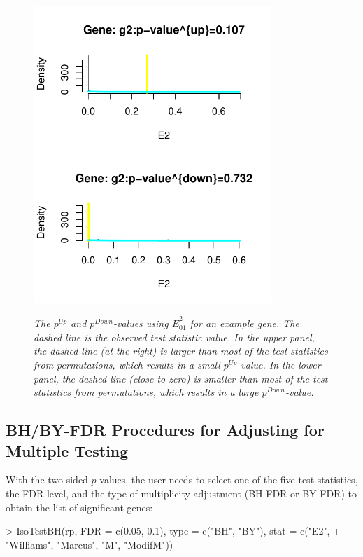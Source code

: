 \documentclass[10pt]{article}
\begin{document}
  
\begin{figure}[!h]
\centering
{\includegraphics[width=0.8\textwidth]{IsoGene-IsopvaluePlot.pdf}}
\caption{\em{The $p^{Up}$ and $p^{Down}$-values using
$\bar{E}_{01}^2$ for an example gene. The dashed line is the
observed test statistic value. In the upper panel, the dashed line
(at the right) is larger than most of the test statistics from
permutations, which results in a small $p^{Up}$-value. In the lower
panel, the dashed line (close to zero) is smaller than most of the
test statistics from permutations, which results in a large
$p^{Down}$-value.}} \label{expvalue}
\end{figure}



\subsection{BH/BY-FDR Procedures for Adjusting for Multiple Testing}

With the two-sided $p$-values, the user needs to select one of the
five test statistics, the FDR level, and the type of multiplicity
adjustment (BH-FDR or BY-FDR) to obtain the list of significant
genes:

\begin{Schunk}
\begin{Sinput}
> IsoTestBH(rp, FDR = c(0.05, 0.1), type = c("BH", "BY"), stat = c("E2", 
+     "Williams", "Marcus", "M", "ModifM"))
\end{Sinput}
\end{Schunk}
\end{document}

